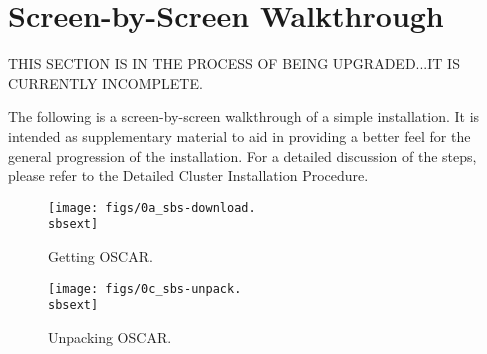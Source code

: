 %
%
%

\newpage

\section{Screen-by-Screen Walkthrough}
\label{app:screen-by-screen}

{\large THIS SECTION IS IN THE PROCESS OF BEING UPGRADED...IT IS
CURRENTLY INCOMPLETE.}

The following is a screen-by-screen walkthrough of a simple installation.
It is intended as supplementary material to aid in providing a better feel
for the general progression of the installation.  For a detailed discussion
of the steps, please refer to the Detailed Cluster Installation Procedure.

\setlength{\oddsidemargin}{-0.5in}
\setlength{\evensidemargin}{-0.5in}
\setlength{\textwidth}{7.5in}

\begin{figure}[htbp]
  \begin{center}
    \texttt{[image: figs/0a\_sbs-download.\\sbsext]}
    \caption{Getting OSCAR.}
    \label{fig:sbs-getting-oscar}
  \end{center}
\end{figure}


\begin{figure}[htbp]
  \begin{center}
    \texttt{[image: figs/0c\_sbs-unpack.\\sbsext]}
    \caption{Unpacking OSCAR.}
    \label{fig:sbs-unpacking-oscar}
  \end{center}
\end{figure}

